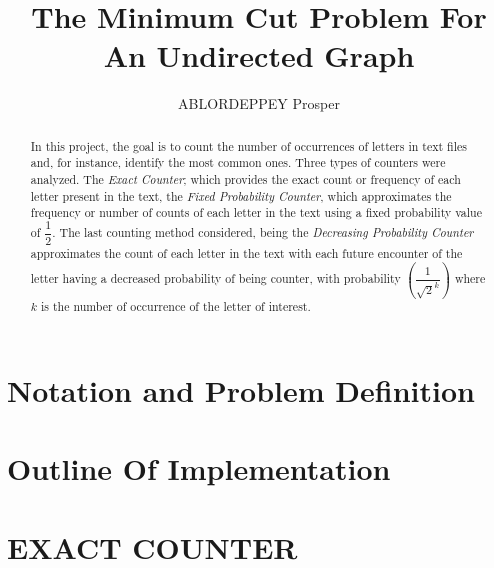 \documentclass[longpaper, english, final, times]{revdetua}
\begin{document}
	
	
	\title{The Minimum Cut Problem For An Undirected Graph}
	\author{ABLORDEPPEY Prosper} %
	\maketitle
	
	\begin{abstract}%
		In this project, the goal is to count the number of occurrences of letters in text files and, for instance, identify the most common ones. Three types of counters were analyzed. The \textit{Exact Counter}; which provides the exact count or frequency of each letter present in the text, the \textit{Fixed Probability Counter}, which approximates the frequency or number of counts of each letter in the text using a fixed probability value of $\dfrac{1}{2}$. The last counting method considered, being the \textit{Decreasing Probability Counter} approximates the count of each letter in the text with each future encounter of the letter having a decreased probability of being counter, with probability $(\dfrac{1}{\sqrt{2}^k})$ where $k$ is the number of occurrence of the letter of interest.
	\end{abstract}
	
	
	

	\section{Notation and Problem Definition}
		
			
	\section{Outline Of Implementation}
		
	 	
	 \section{EXACT COUNTER}
	 
\end{document}
